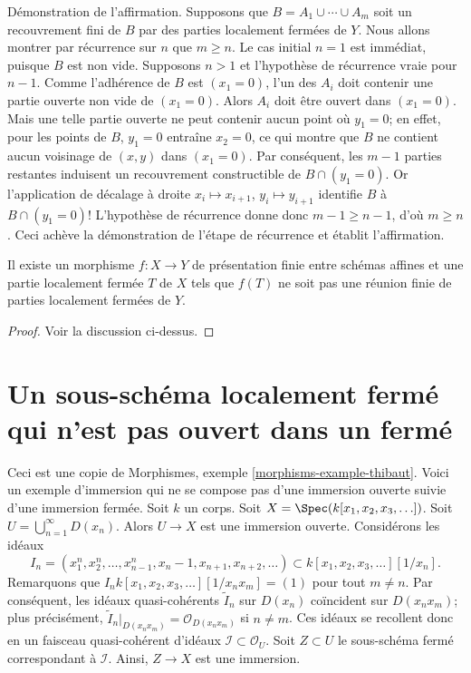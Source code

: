 \medskip\noindent
Démonstration de l'affirmation. Supposons que $B = A_1 \cup \cdots \cup A_m$
soit un recouvrement fini de $B$ par des parties localement fermées de $Y$.
Nous allons montrer par récurrence sur $n$ que $m \geq n$. Le cas initial
$n = 1$ est immédiat, puisque $B$ est non vide. Supposons $n > 1$ et
l'hypothèse de récurrence vraie pour $n - 1$. Comme l'adhérence de $B$ est
$(x_1 = 0)$, l'un des $A_i$ doit contenir une partie ouverte non vide de
$(x_1 = 0)$. Alors $A_i$ doit être ouvert dans $(x_1 = 0)$.
Mais une telle partie ouverte ne peut contenir aucun point où
$y_1 = 0$; en effet, pour les points de $B$, $y_1 = 0$ entraîne $x_2 = 0$,
ce qui montre que $B$ ne contient aucun voisinage de $(x, y)$ dans $(x_1 = 0)$.
Par conséquent, les $m - 1$ parties restantes induisent
un recouvrement constructible de $B \cap (y_1 = 0)$.
Or l'application de décalage à droite
$x_i \mapsto x_{i + 1}$, $y_i \mapsto y_{i + 1}$ identifie $B$
à $B \cap (y_1 = 0)$! L'hypothèse de récurrence donne donc
$m - 1 \geq n - 1$, d'où $m \geq n$. Ceci achève
la démonstration de l'étape de récurrence et établit l'affirmation.

\begin{lemma}
\label{lemma-no-chevalley}
Il existe un morphisme $f : X \to Y$ de présentation finie
entre schémas affines et une partie localement fermée $T$ de $X$
tels que $f(T)$ ne soit pas une réunion finie de parties localement fermées de $Y$.
\end{lemma}

\begin{proof}
Voir la discussion ci-dessus.
\end{proof}










\section[Sous-schéma localement fermé non ouvert dans un fermé]{Un sous-schéma localement fermé qui n'est pas ouvert dans un fermé}
\label{section-strange-immersion}

\noindent
Ceci est une copie de
Morphismes, exemple \ref{morphisms-example-thibaut}.
Voici un exemple d'immersion qui ne se compose pas d'une
immersion ouverte suivie d'une immersion fermée.
Soit $k$ un corps.
Soit $X = \Spec(k[x_1, x_2, x_3, \ldots])$.
Soit $U = \bigcup_{n = 1}^{\infty} D(x_n)$.
Alors $U \to X$ est une immersion ouverte.
Considérons les idéaux
$$
I_n =
(x_1^n, x_2^n, \ldots, x_{n - 1}^n, x_n - 1, x_{n + 1}, x_{n + 2}, \ldots)
\subset
k[x_1, x_2, x_3, \ldots][1/x_n].
$$
Remarquons que $I_n k[x_1, x_2, x_3, \ldots][1/x_nx_m] = (1)$
pour tout $m \not = n$. Par conséquent, les idéaux quasi-cohérents
$\widetilde I_n$ sur $D(x_n)$ coïncident sur $D(x_nx_m)$; plus précisément,
$\widetilde I_n|_{D(x_nx_m)} = \mathcal{O}_{D(x_n x_m)}$ si
$n \not = m$. Ces idéaux se recollent donc en un faisceau quasi-cohérent d'idéaux
$\mathcal{I} \subset \mathcal{O}_U$.
Soit $Z \subset U$ le sous-schéma fermé correspondant à
$\mathcal{I}$. Ainsi, $Z \to X$ est une immersion.

